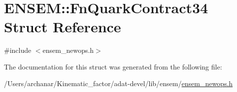 \hypertarget{structENSEM_1_1FnQuarkContract34}{}\section{E\+N\+S\+EM\+:\+:Fn\+Quark\+Contract34 Struct Reference}
\label{structENSEM_1_1FnQuarkContract34}


{\ttfamily \#include $<$ensem\+\_\+newops.\+h$>$}



The documentation for this struct was generated from the following file\+:\begin{DoxyCompactItemize}
\item 
/\+Users/archanar/\+Kinematic\+\_\+factor/adat-\/devel/lib/ensem/\mbox{\hyperlink{adat-devel_2lib_2ensem_2ensem__newops_8h}{ensem\+\_\+newops.\+h}}\end{DoxyCompactItemize}
